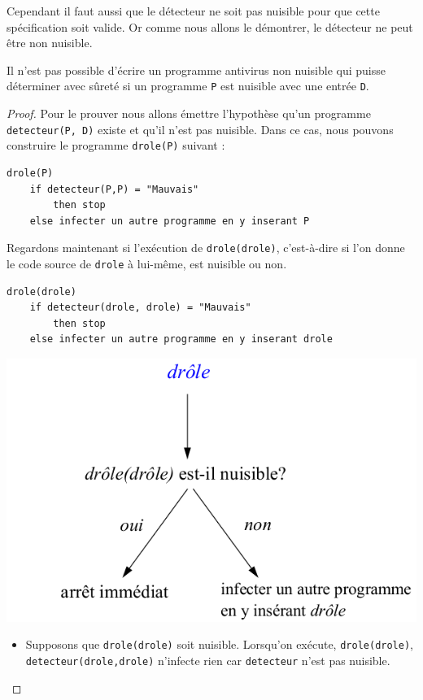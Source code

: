 Cependant il faut aussi que le détecteur ne soit pas nuisible pour que cette spécification soit valide. Or comme nous allons le démontrer, le détecteur ne peut être non nuisible.

\begin{mytheo}
	Il n'est pas possible d'écrire un programme antivirus non nuisible
	qui puisse déterminer avec sûreté
	si un programme \lstinline|P| est nuisible avec une entrée \lstinline|D|.
\end{mytheo}
\begin{proof}
Pour le prouver nous allons émettre l'hypothèse qu'un programme \lstinline|detecteur(P, D)| existe et qu'il n'est pas nuisible. Dans ce cas, nous pouvons construire le programme \lstinline|drole(P)| suivant :

\label{lst:detecteur_de_virus}
\begin{lstlisting}
drole(P)
    if detecteur(P,P) = "Mauvais"
        then stop
    else infecter un autre programme en y inserant P
\end{lstlisting}

Regardons maintenant si l'exécution de \lstinline|drole(drole)|, c'est-à-dire si l'on donne le code source de \lstinline|drole| à lui-même, est nuisible ou non.
\begin{lstlisting}
drole(drole)
    if detecteur(drole, drole) = "Mauvais"
	    then stop
    else infecter un autre programme en y inserant drole
\end{lstlisting}

\begin{center}
\includegraphics[scale=0.5]{Images/drole_de_drole.png}
\end{center}

\begin{itemize}
	\item Supposons que \lstinline|drole(drole)| soit nuisible.
      Lorsqu'on exécute, \lstinline|drole(drole)|,
      \lstinline|detecteur(drole,drole)| n'infecte rien car \lstinline|detecteur| n'est pas nuisible.


\end{itemize}
\end{proof}
